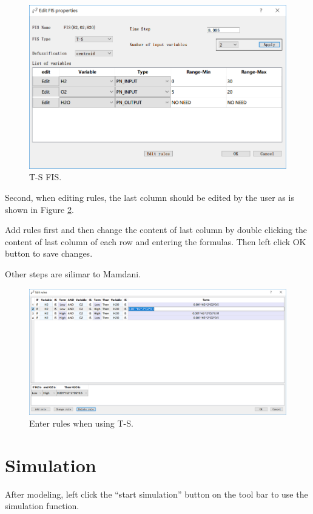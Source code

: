 \documentclass[journal,a4paper,onecolumn]{article}
\begin{document}
\begin{figure}[!hbt]
	\begin{center}
		\includegraphics[width=0.7\columnwidth]{fig11}
		\caption{T-S FIS.}
		\label{fig:T-S FIS}
	\end{center}
\end{figure}
Second, when editing rules, the last column should be edited by the user as is shown in Figure \ref{fig:Enter rules when using T-S}. 

Add rules first and then change the content of last column by double clicking the content of last column of each row and entering the formulas. Then left click OK button to save changes. 

Other steps are silimar to Mamdani.
\begin{figure}[!hbt]
	\begin{center}
		\includegraphics[width=\columnwidth]{fig12}
		\caption{Enter rules when using T-S.}
		\label{fig:Enter rules when using T-S}
	\end{center}
\end{figure}
\clearpage

\section{Simulation}
After modeling, left click the ``start simulation'' button on the tool bar to use the simulation function.
\end{document}
